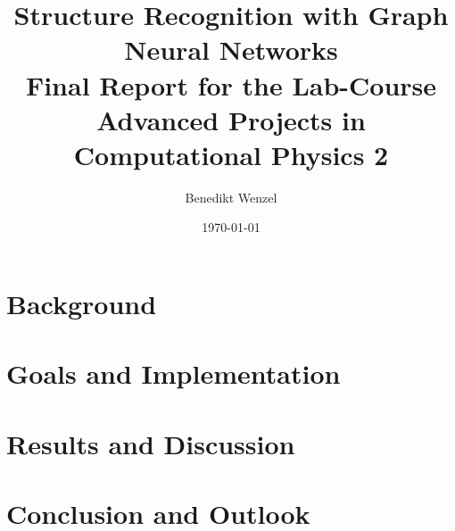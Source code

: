 \documentclass[12pt]{article}
\title{Structure Recognition with Graph Neural Networks \\[1em] \large Final Report for the Lab-Course Advanced Projects in Computational Physics 2}
\author{Benedikt Wenzel}
\date{\today}
\begin{document}
\maketitle

\begin{abstract}

\end{abstract}

\tableofcontents
\newpage

\section{Background}


\section{Goals and Implementation}


\section{Results and Discussion}


\section{Conclusion and Outlook}


\printbibliography
\end{document}
